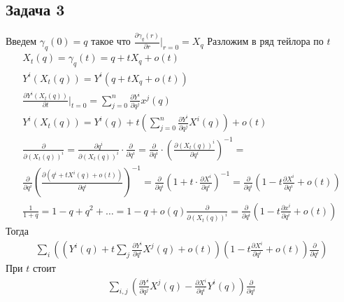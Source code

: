 \subsection*{Задача 3}
	Введем $\gamma_q(0) = q$ такое что $\frac{\partial \gamma_q(r)}{\partial r}|_{r = 0} = X_q$
	Разложим в ряд тейлора по $t$
	\begin{gather*}
		X_t(q) = \gamma_q(t) = q + tX_q + o(t)\\
		Y^{i}(X_t(q)) = Y^{i}(q + tX_q + o(t))\\
		\frac{\partial Y^{i}(X_t(q))}{\partial t}|_{t = 0} = \sum\limits_{j = 0}^{n} \frac{\partial Y^{i}}{\partial q^{j}} x^{j}(q)\\
		Y^{i}(X_t(q)) = Y^{i}(q) + t\left(\sum\limits_{j = 0}^{n} \frac{\partial Y^{i}}{\partial q^{j}} X^{i}(q)\right) + o(t)\\
		\frac{\partial }{\partial (X_t(q))^i} = 
		\frac{\partial q^i}{\partial (X_t (q))^i} \cdot \frac{\partial }{\partial q^i} =
		\frac{\partial }{\partial q^i} \cdot \left(\frac{\partial (X_t(q))^i}{\partial q^i}\right)^{-1} =\\
		\frac{\partial }{\partial q^i} \left(\frac{\partial (q^i + tX^i(q) + o(t))}{\partial q^i}\right)^{-1} =
		\frac{\partial }{\partial q^i} \left(1 + t \cdot \frac{\partial X^i}{\partial q^i}\right)^{-1} =
		\frac{\partial }{\partial q^i}(1 - t \frac{\partial X^i}{\partial q^i} + o(t))\\
		\frac{1}{1+q} = 1 - q + q^2 + \ldots = 1 - q + o(q)
		\frac{\partial }{\partial (X_t(q))^{i}} =
		\frac{\partial }{\partial q^i}\left(1 - t \frac{\partial x^i}{\partial q^i} + o(t)\right)
	\end{gather*}
	Тогда
	\begin{gather*}
		\sum\limits_{i}\left(\left(Y^{i}(q) + t \sum\limits_{j} \frac{\partial Y^{i}}{\partial  q^i} X^{j}(q) + o(t)\right)\left(1 - t \frac{\partial X^i}{\partial  q^i} + o(t)\right) \frac{\partial}{\partial q^i}\right)
	\end{gather*}
	При $t$ стоит
	\begin{gather*}
		\sum\limits_{i,j}\left(\frac{\partial Y^i}{\partial q^j}X^j(q) - \frac{\partial X^{i}}{\partial q^i}Y^{i}(q)\right) \frac{\partial }{\partial  q^i}
	\end{gather*}
\vskip0.5in


